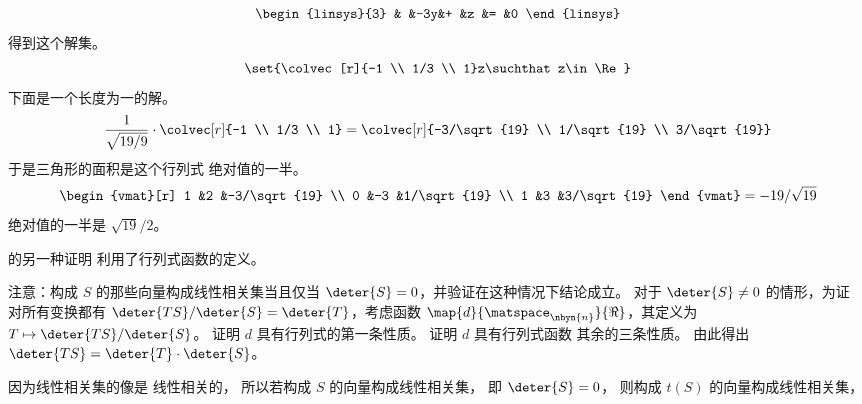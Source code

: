 \begin{exercises}
\begin{answer}
\begin{equation*}
\begin{linsys}{3}
             &   &-3y&+  &z  &=  &0  
        \end{linsys}
      \end{equation*}
      得到这个解集。
      \begin{equation*}
        \set{\colvec[r]{-1 \\ 1/3 \\ 1}z\suchthat z\in\Re}
      \end{equation*}
      下面是一个长度为一的解。
      \begin{equation*}
        \frac{1}{\sqrt{19/9}}\cdot\colvec[r]{-1 \\ 1/3 \\ 1}
        =\colvec[r]{-3/\sqrt{19} \\ 1/\sqrt{19} \\ 3/\sqrt{19}}
      \end{equation*}
      于是三角形的面积是这个行列式
      绝对值的一半。
      \begin{equation*}
        \begin{vmat}[r]
             1  &2   &-3/\sqrt{19}   \\
             0  &-3  &1/\sqrt{19}   \\
             1  &3   &3/\sqrt{19}
        \end{vmat}
        =-19/\sqrt{19}
      \end{equation*} 
      绝对值的一半是 $\sqrt{19}/2$。
    \end{answer}
  \item \label{exer:DetProdEqProdDetsFcn}
     的另一种证明
    利用了行列式函数的定义。
    \begin{exparts}
      \partsitem 注意：构成
        $S$ 的那些向量构成线性相关集当且仅当
        $\deter{S}=0$，并验证在这种情况下结论成立。
      \partsitem 对于 $\deter{S}\neq 0$ 的情形，为证
        对所有变换都有
        $\deter{TS}/\deter{S}=\deter{T}$，考虑函数
        \( \map{d}{\matspace_{\nbyn{n}}}{\Re} \)，其定义为
        \( T\mapsto \deter{TS}/\deter{S} \)。
        证明 $d$ 具有行列式的第一条性质。
      \partsitem 证明 $d$ 具有行列式函数
        其余的三条性质。
      \partsitem 由此得出 $\deter{TS}=\deter{T}\cdot\deter{S}$。 
    \end{exparts}
    \begin{answer}
      \begin{exparts}
        \partsitem 因为线性相关集的像是
          线性相关的，
          所以若构成 $S$ 的向量构成线性相关集，
          即 $\deter{S}=0$，
          则构成 $t(S)$ 的向量构成线性相关集，

\end{exparts}
\end{answer}
\end{exercises}
